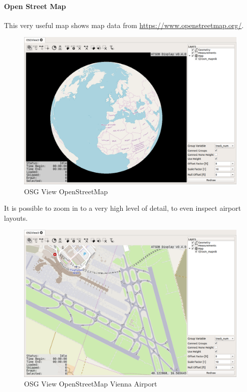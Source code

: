 {\newpage
\paragraph{Open Street Map}

This very useful map shows map data from \url{https://www.openstreetmap.org/}.

\begin{figure}[H]
    \hspace*{-2cm}
    \includegraphics[width=18cm,frame]{../screenshots/osgview_osm.png}
  \caption{OSG View OpenStreetMap}
\end{figure}

It is possible to zoom in to a very high level of detail, to even inspect airport layouts.

\begin{figure}[H]
    \hspace*{-2cm}
    \includegraphics[width=18cm,frame]{../screenshots/osgview_osm_vienna.png}
  \caption{OSG View OpenStreetMap Vienna Airport}
\end{figure}

}
